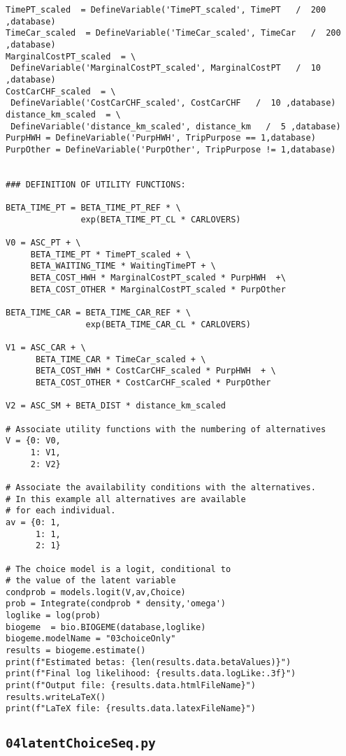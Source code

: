 \documentclass[12pt,a4paper]{article}
\begin{document}
\begin{lstlisting}[style=numbers]
TimePT_scaled  = DefineVariable('TimePT_scaled', TimePT   /  200 ,database)
TimeCar_scaled  = DefineVariable('TimeCar_scaled', TimeCar   /  200 ,database)
MarginalCostPT_scaled  = \
 DefineVariable('MarginalCostPT_scaled', MarginalCostPT   /  10 ,database)
CostCarCHF_scaled  = \
 DefineVariable('CostCarCHF_scaled', CostCarCHF   /  10 ,database)
distance_km_scaled  = \
 DefineVariable('distance_km_scaled', distance_km   /  5 ,database)
PurpHWH = DefineVariable('PurpHWH', TripPurpose == 1,database)
PurpOther = DefineVariable('PurpOther', TripPurpose != 1,database)


### DEFINITION OF UTILITY FUNCTIONS:

BETA_TIME_PT = BETA_TIME_PT_REF * \
               exp(BETA_TIME_PT_CL * CARLOVERS)

V0 = ASC_PT + \
     BETA_TIME_PT * TimePT_scaled + \
     BETA_WAITING_TIME * WaitingTimePT + \
     BETA_COST_HWH * MarginalCostPT_scaled * PurpHWH  +\
     BETA_COST_OTHER * MarginalCostPT_scaled * PurpOther

BETA_TIME_CAR = BETA_TIME_CAR_REF * \
                exp(BETA_TIME_CAR_CL * CARLOVERS)

V1 = ASC_CAR + \
      BETA_TIME_CAR * TimeCar_scaled + \
      BETA_COST_HWH * CostCarCHF_scaled * PurpHWH  + \
      BETA_COST_OTHER * CostCarCHF_scaled * PurpOther 

V2 = ASC_SM + BETA_DIST * distance_km_scaled

# Associate utility functions with the numbering of alternatives
V = {0: V0,
     1: V1,
     2: V2}

# Associate the availability conditions with the alternatives.
# In this example all alternatives are available 
# for each individual.
av = {0: 1,
      1: 1,
      2: 1}

# The choice model is a logit, conditional to 
# the value of the latent variable
condprob = models.logit(V,av,Choice)
prob = Integrate(condprob * density,'omega')
loglike = log(prob)
biogeme  = bio.BIOGEME(database,loglike)
biogeme.modelName = "03choiceOnly"
results = biogeme.estimate()
print(f"Estimated betas: {len(results.data.betaValues)}")
print(f"Final log likelihood: {results.data.logLike:.3f}")
print(f"Output file: {results.data.htmlFileName}")
results.writeLaTeX()
print(f"LaTeX file: {results.data.latexFileName}")
\end{lstlisting}

\subsection{\lstinline$04latentChoiceSeq.py$}
\label{sec:04latentChoiceSeq}
\end{document}
